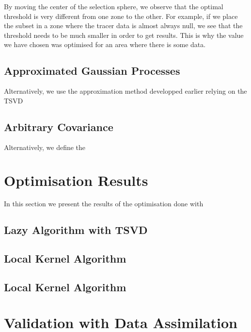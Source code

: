 By moving the center of the selection sphere, we observe that the optimal threshold is very different from one zone to the other. For example, if we place the subset in a zone where the tracer data is almost always null, we see that the threshold needs to be much smaller in order to get results. This is why the value we have chosen was optimised for an area where there is some data. 


\subsection{Approximated Gaussian Processes}

Alternatively, we use the approximation method developped earlier relying on the TSVD 

\subsection{Arbitrary Covariance}

Alternatively, we define the 






\section{Optimisation Results}

In this section we present the results of the optimisation done with 

\subsection{}

\subsection{Lazy Algorithm with TSVD}

\subsection{Local Kernel Algorithm}

\subsection{Local Kernel Algorithm}





\section{Validation with Data Assimilation}